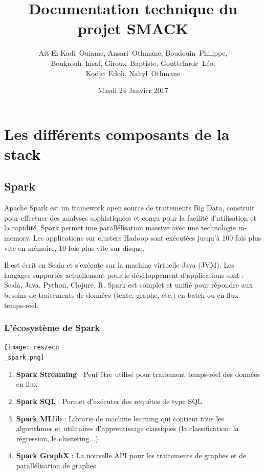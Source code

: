 \documentclass[a4paper, 11pt, titlepage]{article}
\title {{ {\huge Documentation technique du projet SMACK }} }
\author{%
    {\sc Ait El Kadi}~Ouiame,
    {\sc Ansari}~Othmane,
    {\sc Boudouin}~Philippe,\\
    {\sc Boukrouh}~Insaf,
    {\sc Giroux}~Baptiste,
    {\sc Gouttefarde}~Léo,\\
    {\sc Kodjo}~Edoh,
    {\sc Nahyl}~Othmane
}
\date{Mardi 24 Janvier 2017}
\begin{document}
\pagestyle{fancy}
\maketitle

\setcounter{tocdepth}{2}

\tableofcontents
\newpage

\section {Les différents composants de la stack}

\subsection {Spark}

Apache Spark est un framework open source de traitements Big Data, construit pour effectuer des analyses sophistiquées et conçu pour la facilité d'utilisation et la rapidité.
Spark permet une parallélisation massive avec une technologie in-memory. Les applications sur clusters Hadoop sont exécutées jusqu'à 100 fois plus vite en mémoire, 10 fois plus vite sur disque.

Il est écrit en Scala et s'exécute sur la machine virtuelle Java (JVM). Les langages supportés actuellement pour le développement d'applications sont : Scala, Java, Python, Clojure, R. Spark est complet et unifié pour répondre aux besoins de traitements de données (texte, graphe, etc.) en batch ou en flux temps-réel.


\subsubsection* {L'écosystème de Spark}

\begin{center}
\texttt{[image: res/eco\\\_spark.png]}
\end{center}


\begin{enumerate}

\item
\textbf{Spark Streaming} : Peut être utilisé pour traitement temps-réel des données en flux

\item
\textbf{Spark SQL} : Permet d'exécuter des requêtes de type SQL

\item
\textbf{Spark MLlib} : Librarie de machine learning qui contient tous les algorithmes et utilitaires d'apprentissage classiques (la classification, la régression, le clustering...)

\item
\textbf{Spark GraphX} : La nouvelle API pour les traitements de graphes et de parallélisation de graphes

\end{enumerate}
\end{document}

